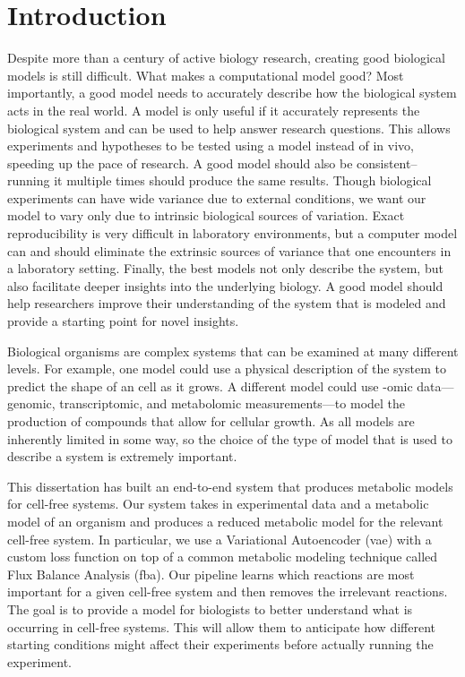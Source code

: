 \chapter{Introduction}
\setcounter{page}{1} 

Despite more than a century of active biology research, creating good biological models is still difficult.
What makes a computational model good?
Most importantly, a good model needs to accurately describe how the biological system acts in the real world.
A model is only useful if it accurately represents the biological system and can be used to help answer research questions.
This allows experiments and hypotheses to be tested using a model instead of in vivo, speeding up the pace of research.
A good model should also be consistent--running it multiple times should produce the same results.
Though biological experiments can have wide variance due to external conditions, we want our model to vary only due to intrinsic biological sources of variation.
Exact reproducibility is very difficult in laboratory environments, but a computer model can and should eliminate the extrinsic sources of variance that one encounters in a laboratory setting.
Finally, the best models not only describe the system, but also facilitate deeper insights into the underlying biology.
A good model should help researchers improve their understanding of the system that is modeled and provide a starting point for novel insights.

Biological organisms are complex systems that can be examined at many different levels.
For example, one model could use a physical description of the system to predict the shape of an cell as it grows.
A different model could use -omic data---genomic, transcriptomic, and metabolomic measurements---to model the production of compounds that allow for cellular growth.
As all models are inherently limited in some way, so the choice of the type of model that is used to describe a system is extremely important.

This dissertation has built an end-to-end system that produces metabolic models for cell-free systems.
Our system takes in experimental data and a metabolic model of an organism and produces a reduced metabolic model for the relevant cell-free system.
In particular, we use a Variational Autoencoder (\gls{vae}) with a custom loss function on top of a common metabolic modeling technique called Flux Balance Analysis (\gls{fba}).
Our pipeline learns which reactions are most important for a given cell-free system and then removes the irrelevant reactions.
The goal is to provide a model for biologists to better understand what is occurring in cell-free systems.
This will allow them to anticipate how different starting conditions might affect their experiments before actually running the experiment.

